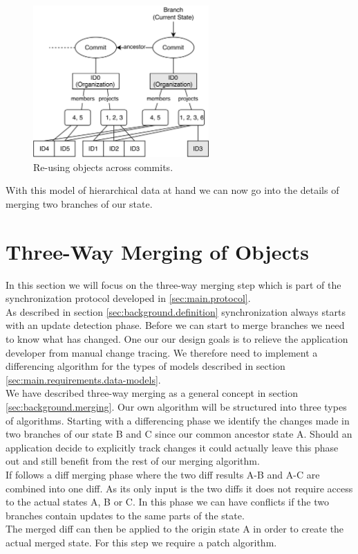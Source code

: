 \begin{figure}[commits]
  \centering
  \includegraphics[width=0.6\textwidth]{img/commits}
  \caption{Re-using objects across commits.}
  \label{fig:histo.commits}
\end{figure}

With this model of hierarchical data at hand we can now go into the details of merging two branches of our state.

\section{Three-Way Merging of Objects}
\label{sec:main.histo.merging}
In this section we will focus on the three-way merging step which is part of the synchronization protocol developed in \ref{sec:main.protocol}.\\
As described in section \ref{sec:background.definition} synchronization always starts with an update detection phase.
Before we can start to merge branches we need to know what has changed.
One our our design goals is to relieve the application developer from manual change tracing.
We therefore need to implement a differencing algorithm for the types of models described in section \ref{sec:main.requirements.data-models}.\\
We have described three-way merging as a general concept in section \ref{sec:background.merging}.
Our own algorithm will be structured into three types of algorithms.
Starting with a differencing phase we identify the changes made in two branches of our state B and C since our common ancestor state A.
Should an application decide to explicitly track changes it could actually leave this phase out and still benefit from the rest of our merging algorithm.\\
If follows a diff merging phase where the two diff results A-B and A-C are combined into one diff.
As its only input is the two diffs it does not require access to the actual states A, B or C.
In this phase we can have conflicts if the two branches contain updates to the same parts of the state.\\
The merged diff can then be applied to the origin state A in order to create the actual merged state.
For this step we require a patch algorithm.

